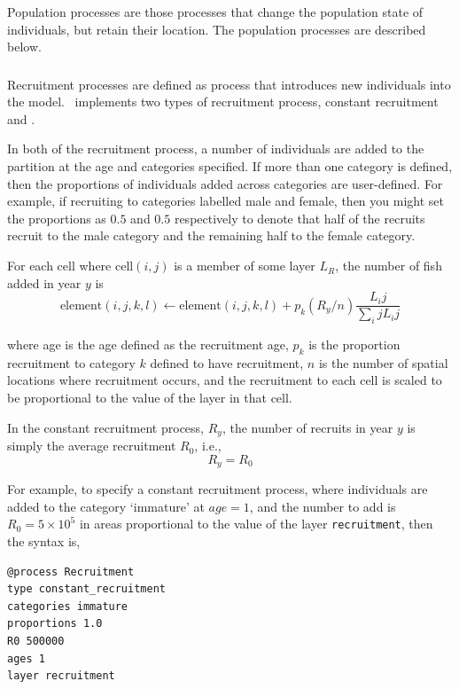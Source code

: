 Population processes are those processes that change the population state of individuals, but retain their location. The population processes are described below.

\subsubsection{}

Recruitment processes are defined as  process that introduces new individuals into the model. \SPM\ implements two types of recruitment process, constant recruitment and  \citep{1203} \NYI. 

In both of the recruitment process, a number of individuals are added to the partition at the age and categories specified. If more than one category is defined, then the proportions of individuals added across categories are user-defined. For example, if recruiting to categories labelled male and female, then you might set the proportions as $0.5$ and $0.5$ respectively to denote that half of the recruits recruit to the male category and the remaining half to the female category.

For each cell where cell$(i,j)$ is a member of some layer $L_R$, the  number of fish added in year $y$ is 
\begin{equation}
  \text{element}(i,j,k,l) \leftarrow \text{element}(i,j,k,l) + p_k(R_y / n) \frac{L_ij}{\sum_ij L_ij}
\end{equation}

where age is the age defined as the recruitment age, $p_k$ is the proportion recruitment to category $k$ defined to have recruitment, $n$ is the number of spatial locations where recruitment occurs, and the recruitment to each cell is scaled to be proportional to the value of the layer in that cell.

In the constant recruitment process, $R_y$, the number of recruits in year $y$ is simply the average recruitment $R_0$, i.e.,
\begin{equation}
  R_y = R_0
\end{equation}

For example, to specify a constant recruitment process, where individuals are added to the category `immature' at $age=1$, and the number to add is $R_0=5 \times 10^5$ in areas proportional to the value of the layer \texttt{recruitment}, then the syntax is,

\begin{verbatim}
@process Recruitment
type constant_recruitment
categories immature
proportions 1.0
R0 500000
ages 1
layer recruitment
\end{verbatim}


